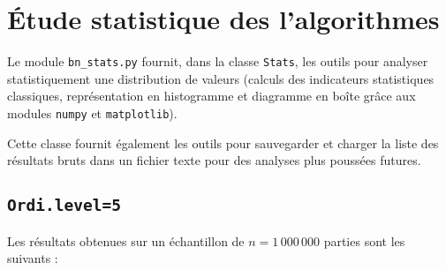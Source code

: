 \chapter{Étude statistique des l'algorithmes}\label{annexe_stats}
Le module \texttt{bn\_stats.py} fournit, dans la classe \texttt{Stats}, les outils pour analyser statistiquement une distribution de valeurs (calculs des indicateurs statistiques classiques, représentation en histogramme et diagramme en boîte grâce aux modules \texttt{numpy} et \texttt{matplotlib}).

Cette classe fournit également les outils pour sauvegarder et charger la liste des résultats bruts dans un fichier texte pour des analyses plus poussées futures.
\section{\texttt{Ordi.level=5}}
Les résultats obtenues sur un échantillon de $n=1\,000\,000$ parties sont les suivants :
